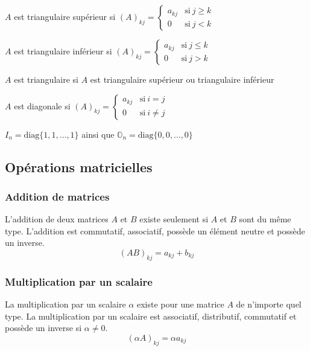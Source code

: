 \begin{definition}
    $A$ est triangulaire supérieur si $(A)_{kj} = \begin{cases}
            a_{kj} & \text{si} \ j \geq k \\
            0      & \text{si} \ j < k
        \end{cases}$
\end{definition}
\begin{definition}
    $A$ est triangulaire inférieur si $(A)_{kj} = \begin{cases}
            a_{kj} & \text{si} \ j \leq k \\
            0      & \text{si} \ j > k
        \end{cases}$
\end{definition}
\begin{remark}
    $A$ est triangulaire si $A$ est triangulaire supérieur ou triangulaire inférieur
\end{remark}
\begin{definition}
    $A$ est diagonale si $(A)_{kj} = \begin{cases}
            a_{kj} & \text{si} \ i = j    \\
            0      & \text{si} \ i \neq j
        \end{cases}$
    \begin{remark}
        $I_n = \text{diag}\{ 1, 1, \dots, 1 \}$ ainsi que $\mathbb{O}_n = \text{diag}\{ 0, 0, \dots, 0 \}$
    \end{remark}
\end{definition}


\subsection{Opérations matricielles}

\subsubsection{Addition de matrices}
\noindent
L'addition de deux matrices $A$ et $B$ existe seulement si $A$ et $B$ sont du même type.
L'addition est commutatif, associatif, possède un élément neutre et possède un inverse.
\[ (AB)_{kj} = a_{kj} + b_{kj} \]

\subsubsection{Multiplication par un scalaire}
\noindent
La multiplication par un scalaire $\alpha$ existe pour une matrice $A$ de n'importe quel type. La multiplication
par un scalaire est associatif, distributif, commutatif et possède un inverse si $\alpha \neq 0$.
\[ (\alpha A)_{kj} = \alpha a_{kj}\]

